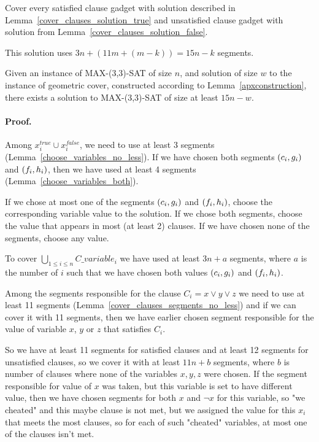 Cover every satisfied clause gadget with solution described in
Lemma~\ref{cover_clauses_solution_true}
and unsatisfied clause gadget with solution from
Lemma~\ref{cover_clauses_solution_false}.

This solution uses $3n + (11m + (m-k)) = 15n - k$ segments.

\begin{lemma}
	\label{construction_completness}
	Given an instance of MAX-(3,3)-SAT of size $n$,
	and solution of size $w$ to the instance of geometric cover,
	constructed	according to Lemma~\ref{apxconstruction},  
	there exists a solution to MAX-(3,3)-SAT of size at least $15n - w$.
\end{lemma}
\paragraph{Proof.}
Among $x_i^{true} \cup x_i^{false}$,
we need to use at least 3 segments (Lemma~\ref{choose_variables_no_less}).
If we have chosen both segments $(c_i, g_i)$ and $(f_i, h_i)$,
then we have used at least 4 segments (Lemma~\ref{choose_variables_both}).

If we chose at most one of the segments $(c_i, g_i)$ and $(f_i, h_i)$,
choose the corresponding variable value to the solution.
If we chose both segments,
choose the value that appears in most (at least 2) clauses.
If we have chosen none of the segments, choose any value.

To cover $\bigcup_{1 \le i \le n} C\_variable_i$
we have used at least $3n + a$ segments,
where $a$ is the number of $i$ such that we have chosen both
values $(c_i, g_i)$ and $(f_i, h_i)$.

Among the segments responsible for the clause $C_i = x \lor y \lor z$
we need to use at least 11 segments
(Lemma~\ref{cover_clauses_segments_no_less})
and if we can cover it with 11 segments, then we have 
earlier chosen
segment responsible for the value of variable $x$, $y$ or $z$
that satisfies $C_i$.

So we have at least 11 segments for satisfied clauses
and at least 12 segments
for unsatisfied clauses, so we cover it with 
at least $11n + b$ segments, where $b$ is number of clauses
where none of the variables $x, y, z$ were chosen.
If the segment responsible for value of $x$ was taken,
but this variable is set to have different value,
then we have chosen segments for both $x$ and $\neg x$ for this variable,
so "we cheated" and this maybe clause is not met,
but we assigned the value for this $x_i$ that meets
the most clauses, so for each of such "cheated" variables,
at most one of the clauses isn't met.

